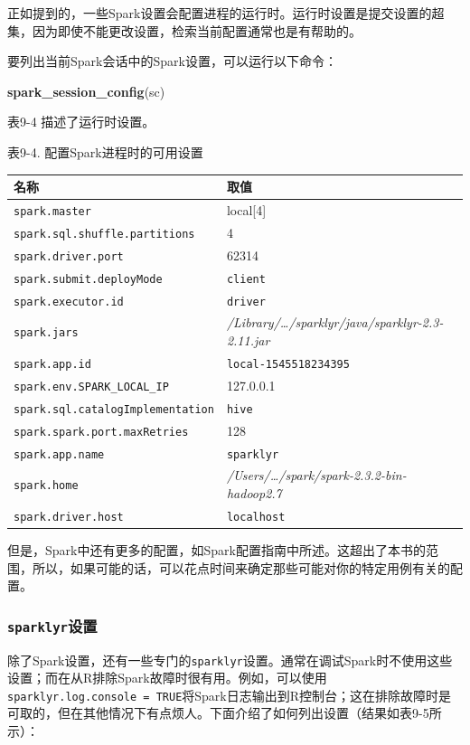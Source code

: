 \documentclass[
]{article}
\newenvironment{Shaded}{\begin{snugshade}}{\end{snugshade}}
\newcommand{\KeywordTok}[1]{\textcolor[rgb]{0.13,0.29,0.53}{\textbf{#1}}}
\newcommand{\NormalTok}[1]{#1}
\begin{document}
正如提到的，一些Spark设置会配置进程的运行时。运行时设置是提交设置的超集，因为即使不能更改设置，检索当前配置通常也是有帮助的。

要列出当前Spark会话中的Spark设置，可以运行以下命令：

\begin{Shaded}
\begin{Highlighting}[]
\KeywordTok{spark_session_config}\NormalTok{(sc)}
\end{Highlighting}
\end{Shaded}

表9-4 描述了运行时设置。

表9-4. 配置Spark进程时的可用设置

\begin{longtable}[]{@{}ll@{}}
\toprule
名称 & 取值\tabularnewline
\midrule
\endhead
\texttt{spark.master} & local{[}4{]}\tabularnewline
\texttt{spark.sql.shuffle.partitions} & 4\tabularnewline
\texttt{spark.driver.port} & 62314\tabularnewline
\texttt{spark.submit.deployMode} & \texttt{client}\tabularnewline
\texttt{spark.executor.id} & \texttt{driver}\tabularnewline
\texttt{spark.jars} &
\emph{/Library/\ldots/sparklyr/java/sparklyr-2.3-2.11.jar}\tabularnewline
\texttt{spark.app.id} & \texttt{local-1545518234395}\tabularnewline
\texttt{spark.env.SPARK\_LOCAL\_IP} & 127.0.0.1\tabularnewline
\texttt{spark.sql.catalogImplementation} & \texttt{hive}\tabularnewline
\texttt{spark.spark.port.maxRetries} & 128\tabularnewline
\texttt{spark.app.name} & \texttt{sparklyr}\tabularnewline
\texttt{spark.home} &
\emph{/Users/\ldots/spark/spark-2.3.2-bin-hadoop2.7}\tabularnewline
\texttt{spark.driver.host} & \texttt{localhost}\tabularnewline
\bottomrule
\end{longtable}

但是，Spark中还有更多的配置，如Spark配置指南中所述。这超出了本书的范围，所以，如果可能的话，可以花点时间来确定那些可能对你的特定用例有关的配置。

\hypertarget{sparklyrux8bbeux7f6e}{%
\subsubsection{\texorpdfstring{\texttt{sparklyr}设置}{sparklyr设置}}\label{sparklyrux8bbeux7f6e}}

除了Spark设置，还有一些专门的\texttt{sparklyr}设置。通常在调试Spark时不使用这些设置；而在从R排除Spark故障时很有用。例如，可以使用\texttt{sparklyr.log.console\ =\ TRUE}将Spark日志输出到R控制台；这在排除故障时是可取的，但在其他情况下有点烦人。下面介绍了如何列出设置（结果如表9-5所示）：
\end{document}

